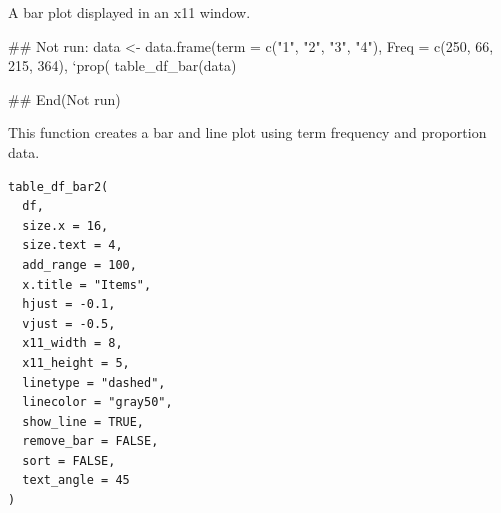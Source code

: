 \documentclass[a4paper]{book}
\begin{document}
%
\begin{Value}
A bar plot displayed in an x11 window.
\end{Value}
%
\begin{Examples}
\begin{ExampleCode}
## Not run: 
data <- data.frame(term = c("1", "2", "3", "4"), Freq = c(250, 66, 215, 364),
                   `prop(%
table_df_bar(data)

## End(Not run)
\end{ExampleCode}
\end{Examples}
%
\begin{Description}
This function creates a bar and line plot using term frequency and proportion data.
\end{Description}
%
\begin{Usage}
\begin{verbatim}
table_df_bar2(
  df,
  size.x = 16,
  size.text = 4,
  add_range = 100,
  x.title = "Items",
  hjust = -0.1,
  vjust = -0.5,
  x11_width = 8,
  x11_height = 5,
  linetype = "dashed",
  linecolor = "gray50",
  show_line = TRUE,
  remove_bar = FALSE,
  sort = FALSE,
  text_angle = 45
)
\end{verbatim}
\end{Usage}
%
\end{document}
